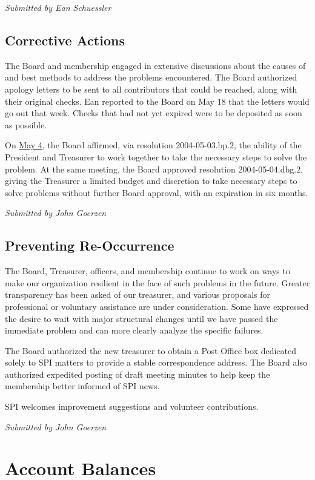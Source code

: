 \documentclass[letterpaper]{report}
\begin{document}
\emph{Submitted by Ean Schuessler}


\subsection{Corrective Actions}

The Board and membership engaged in extensive discussions about the
causes of and best methods to address the problems encountered. The
Board authorized apology letters to be sent to all contributors that
could be reached, along with their original checks. Ean reported to
the Board on May 18 that the letters would go out that week. Checks
that had not yet expired were to be deposited as soon as possible.

On \href{http://lists.spi-inc.org/pipermail/spi-announce/2004/000074.html}{May 4},
the Board affirmed, via resolution 2004-05-03.bp.2, the ability of
the President and Treasurer to work together to take the necessary
steps to solve the problem. At the same meeting, the Board approved
resolution 2004-05-04.dbg.2, giving the Treasurer a limited budget
and discretion to take necessary steps to solve problems without further
Board approval, with an expiration in six months.

\emph{Submitted by John Goerzen}


\subsection{Preventing Re-Occurrence}

The Board, Treasurer, officers, and membership continue to work on
ways to make our organization resilient in the face of such problems
in the future. Greater transparency has been asked of our treasurer,
and various proposals for professional or voluntary assistance are
under consideration. Some have expressed the desire to wait with major
structural changes until we have passed the immediate problem and
can more clearly analyze the specific failures.

The Board authorized the new treasurer to obtain a Post Office box
dedicated solely to SPI matters to provide a stable correspondence
address. The Board also authorized expedited posting of draft meeting
minutes to help keep the membership better informed of SPI news.

SPI welcomes improvement suggestions and volunteer contributions.

\emph{Submitted by John Goerzen}


\section{Account Balances}
\end{document}
